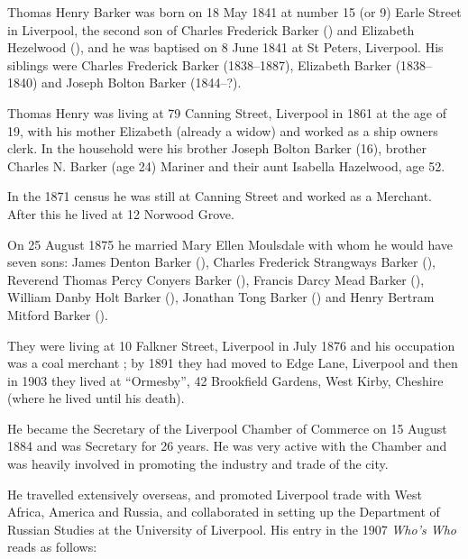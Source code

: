 
Thomas Henry Barker was born on 18 May 1841\cite{THBbirth} at number 15 (or 9\cite{THBbirth}) Earle Street in Liverpool,\cite{THBplantagenets} the second son of Charles Frederick Barker () and Elizabeth Hezelwood (), and he was baptised on 8 June 1841 at St Peters, Liverpool.\cite{THBarkerBaptism} His siblings were Charles Frederick Barker (1838--1887),  Elizabeth Barker (1838--1840) and Joseph Bolton Barker (1844--?).

Thomas Henry was living at 79 Canning Street, Liverpool in 1861 at the age of 19, with his mother Elizabeth (already a widow) and worked as a ship owners clerk.  In the household were his brother Joseph Bolton Barker (16), brother Charles N. Barker (age 24) Mariner and their aunt Isabella Hazelwood, age 52.

In the 1871 census he was still at Canning Street and worked as a Merchant. After this he lived at 12 Norwood Grove\cite{THBcensus}.

On 25 August 1875 he married Mary Ellen Moulsdale\cite{THBmarriage} with whom he would have seven sons:\cite{THBplantagenets}  James Denton Barker (), Charles Frederick Strangways Barker (), Reverend Thomas Percy Conyers Barker (), Francis Darcy Mead Barker (), William Danby Holt Barker (), 
Jonathan Tong Barker () and Henry Bertram Mitford Barker ().
 
They were living at 10 Falkner Street, Liverpool in July 1876 and his occupation was a coal merchant \cite{THBoccupation};  by 1891 they had moved to Edge Lane, Liverpool\cite{THBresidence} and then in 1903 they lived at ``Ormesby'', 42 Brookfield Gardens, West Kirby, Cheshire (where he lived until his death).\cite{THBdeathcert}

He became the Secretary of the Liverpool Chamber of Commerce on 15 August 1884 and was Secretary for 26 years.  He was very active with the Chamber and was heavily involved in promoting the industry and trade of the city.  

He travelled extensively overseas, and promoted Liverpool trade with West Africa, America and Russia, and collaborated in setting up the Department of Russian Studies at the University of Liverpool. His entry in  the 1907 \emph{Who's Who} reads as follows:

